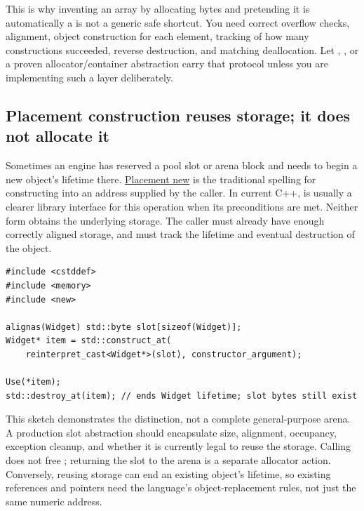 This is why inventing an array by allocating  bytes and pretending it is automatically a  is not a generic safe shortcut. You need correct overflow checks, alignment, object construction for each element, tracking of how many constructions succeeded, reverse destruction, and matching deallocation. Let , , or a proven allocator/container abstraction carry that protocol unless you are implementing such a layer deliberately.

\subsection{Placement construction reuses storage; it does not allocate it}\label{01-foundations-i-ch004-placement-construction-reuses-storage-it-does-not-allocate-it}

\hypertarget{01-foundations-i-ch004-placement-construction-reuses-storage-it-does-not-allocate-it}{}

Sometimes an engine has reserved a pool slot or arena block and needs to begin a new object's lifetime there. \hyperref[appendix-f56c3e43fd4e]{Placement new} is the traditional spelling for constructing into an address supplied by the caller. In current C++,  is usually a clearer library interface for this operation when its preconditions are met. Neither form obtains the underlying storage. The caller must already have enough correctly aligned storage, and must track the lifetime and eventual destruction of the object.

\begin{verbatim}
#include <cstddef>
#include <memory>
#include <new>

alignas(Widget) std::byte slot[sizeof(Widget)];
Widget* item = std::construct_at(
    reinterpret_cast<Widget*>(slot), constructor_argument);

Use(*item);
std::destroy_at(item); // ends Widget lifetime; slot bytes still exist
\end{verbatim}

This sketch demonstrates the distinction, not a complete general-purpose arena. A production slot abstraction should encapsulate size, alignment, occupancy, exception cleanup, and whether it is currently legal to reuse the storage. Calling  does not free ; returning the slot to the arena is a separate allocator action. Conversely, reusing storage can end an existing object's lifetime, so existing references and pointers need the language's object-replacement rules, not just the same numeric address.

